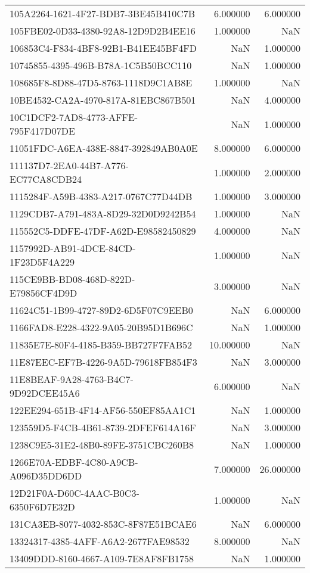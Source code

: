 \begin{tabular}{lrr}
105A2264-1621-4F27-BDB7-3BE45B410C7B & 6.000000 & 6.000000 \\
105FBE02-0D33-4380-92A8-12D9D2B4EE16 & 1.000000 & NaN \\
106853C4-F834-4BF8-92B1-B41EE45BF4FD & NaN & 1.000000 \\
10745855-4395-496B-B78A-1C5B50BCC110 & NaN & 1.000000 \\
108685F8-8D88-47D5-8763-1118D9C1AB8E & 1.000000 & NaN \\
10BE4532-CA2A-4970-817A-81EBC867B501 & NaN & 4.000000 \\
10C1DCF2-7AD8-4773-AFFE-795F417D07DE & NaN & 1.000000 \\
11051FDC-A6EA-438E-8847-392849AB0A0E & 8.000000 & 6.000000 \\
111137D7-2EA0-44B7-A776-EC77CA8CDB24 & 1.000000 & 2.000000 \\
1115284F-A59B-4383-A217-0767C77D44DB & 1.000000 & 3.000000 \\
1129CDB7-A791-483A-8D29-32D0D9242B54 & 1.000000 & NaN \\
115552C5-DDFE-47DF-A62D-E98582450829 & 4.000000 & NaN \\
1157992D-AB91-4DCE-84CD-1F23D5F4A229 & 1.000000 & NaN \\
115CE9BB-BD08-468D-822D-E79856CF4D9D & 3.000000 & NaN \\
11624C51-1B99-4727-89D2-6D5F07C9EEB0 & NaN & 6.000000 \\
1166FAD8-E228-4322-9A05-20B95D1B696C & NaN & 1.000000 \\
11835E7E-80F4-4185-B359-BB727F7FAB52 & 10.000000 & NaN \\
11E87EEC-EF7B-4226-9A5D-79618FB854F3 & NaN & 3.000000 \\
11E8BEAF-9A28-4763-B4C7-9D92DCEE45A6 & 6.000000 & NaN \\
122EE294-651B-4F14-AF56-550EF85AA1C1 & NaN & 1.000000 \\
123559D5-F4CB-4B61-8739-2DFEF614A16F & NaN & 3.000000 \\
1238C9E5-31E2-48B0-89FE-3751CBC260B8 & NaN & 1.000000 \\
1266E70A-EDBF-4C80-A9CB-A096D35DD6DD & 7.000000 & 26.000000 \\
12D21F0A-D60C-4AAC-B0C3-6350F6D7E32D & 1.000000 & NaN \\
131CA3EB-8077-4032-853C-8F87E51BCAE6 & NaN & 6.000000 \\
13324317-4385-4AFF-A6A2-2677FAE98532 & 8.000000 & NaN \\
13409DDD-8160-4667-A109-7E8AF8FB1758 & NaN & 1.000000 \\

\end{tabular}
